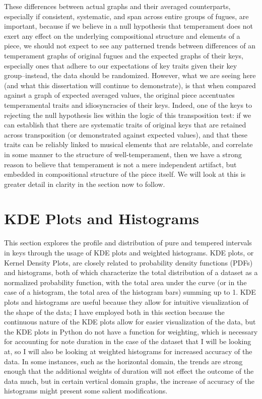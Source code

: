 These differences between actual graphs and their averaged counterparts,
especially if consistent, systematic, and span across entire groups of
fugues, are important, because if we believe in a null hypothesis that
temperament does not exert any effect on the underlying compositional
structure and elements of a piece, we should not expect to see any
patterned trends between differences of an temperament graphs of
original fugues and the expected graphs of their keys, especially ones
that adhere to our expectations of key traits given their key
group--instead, the data should be randomized. However, what we are
seeing here (and what this dissertation will continue to demonstrate),
is that when compared against a graph of expected averaged values, the
original piece accentuates temperamental traits and idiosyncracies of
their keys. Indeed, one of the keys to rejecting the null hypothesis
lies within the logic of this transposition test: if we can establish
that there are systematic traits of original keys that are retained
across transposition (or demonstrated against expected values), and that
these traits can be reliably linked to musical elements that are
relatable, and correlate in some manner to the structure of
well-temperament, then we have a strong reason to believe that
temperament is not a mere independent artifact, but embedded in
compositional structure of the piece itself. We will look at this is
greater detail in clarity in the section now to follow.

    \section{KDE Plots and Histograms}\label{kde-plots-and-histograms}

This section explores the profile and distribution of pure and tempered
intervals in keys through the usage of KDE plots and weighted
histograms. KDE plots, or Kernel Density Plots, are closely related to
probability density functions (PDFs) and histograms, both of which
characterize the total distribution of a dataset as a normalized
probability function, with the total area under the curve (or in the
case of a histogram, the total area of the histogram bars) summing up to
1. KDE plots and histograms are useful because they allow for intuitive
visualization of the shape of the data; I have employed both in this
section because the continuous nature of the KDE plots allow for easier
visualization of the data, but the KDE plots in Python do not have a
function for weighting, which is necessary for accounting for note
duration in the case of the dataset that I will be looking at, so I will
also be looking at weighted histograms for increased accuracy of the
data. In some instances, such as the horizontal domain, the trends are
strong enough that the additional weights of duration will not effect
the outcome of the data much, but in certain vertical domain graphs, the
increase of accuracy of the histograms might present some salient
modifications.

